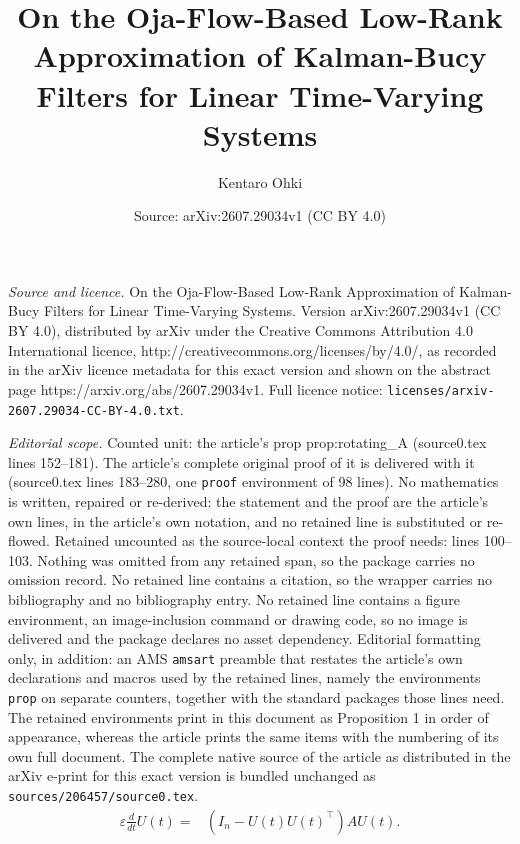 \documentclass[10pt,a4paper]{amsart}
\title{On the Oja-Flow-Based Low-Rank Approximation of Kalman-Bucy Filters for Linear Time-Varying Systems}
\author{Kentaro Ohki}
\date{Source: arXiv:2607.29034v1 (CC BY 4.0)}
\begin{document}
\maketitle

\noindent\emph{Source and licence.} On the Oja-Flow-Based Low-Rank Approximation of Kalman-Bucy Filters for Linear Time-Varying Systems. Version arXiv:2607.29034v1 (CC BY 4.0), distributed by arXiv under the Creative Commons Attribution 4.0 International licence, http://creativecommons.org/licenses/by/4.0/, as recorded in the arXiv licence metadata for this exact version and shown on the abstract page https://arxiv.org/abs/2607.29034v1. Full licence notice: \texttt{licenses/arxiv-2607.29034-CC-BY-4.0.txt}.\par\smallskip

\noindent\textit{Editorial scope.} Counted unit: the article's prop prop:rotating\_A (source0.tex lines 152--181). The article's complete original proof of it is delivered with it (source0.tex lines 183--280, one \texttt{proof} environment of 98 lines). No mathematics is written, repaired or re-derived: the statement and the proof are the article's own lines, in the article's own notation, and no retained line is substituted or re-flowed.  Retained uncounted as the source-local context the proof needs: lines 100--103.  Nothing was omitted from any retained span, so the package carries no omission record.  No retained line contains a citation, so the wrapper carries no bibliography and no bibliography entry.  No retained line contains a figure environment, an image-inclusion command or drawing code, so no image is delivered and the package declares no asset dependency.  Editorial formatting only, in addition: an AMS \texttt{amsart} preamble that restates the article's own declarations and macros used by the retained lines, namely the environments \texttt{prop} on separate counters, together with the standard packages those lines need.  The retained environments print in this document as Proposition 1 in order of appearance, whereas the article prints the same items with the numbering of its own full document.  The complete native source of the article as distributed in the arXiv e-print for this exact version is bundled unchanged as \texttt{sources/206457/source0.tex}.
    \begin{align}
    \varepsilon \frac{d}{dt} U(t) = & ( I_{n} - U(t) U(t) ^{\top} ) A U(t) .
    \label{eq:Oja_flow}
    \end{align}
\end{document}
